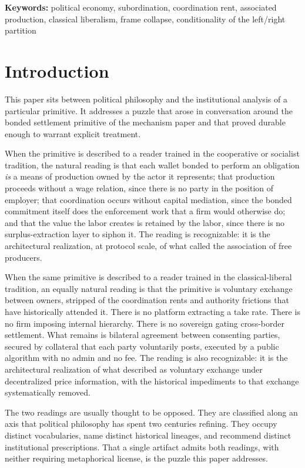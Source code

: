 \documentclass[11pt,a4paper]{article}
\theoremstyle{remark}
\begin{document}
\medskip
\noindent\textbf{Keywords:}
political economy, subordination, coordination rent, associated
production, classical liberalism, frame collapse, conditionality of
the left/right partition

\section{Introduction}
\label{sec:intro}

This paper sits between political philosophy and the institutional
analysis of a particular primitive. It addresses a puzzle that
arose in conversation around the bonded settlement primitive
of the mechanism paper and that proved durable enough to
warrant explicit treatment.

When the primitive is described to a reader trained in the
cooperative or socialist tradition, the natural reading is that
each wallet bonded to perform an obligation \emph{is} a means of
production owned by the actor it represents; that production
proceeds without a wage relation, since there is no party in the
position of employer; that coordination occurs without capital
mediation, since the bonded commitment itself does the
enforcement work that a firm would otherwise do; and that the
value the labor creates is retained by the labor, since there
is no surplus-extraction layer to siphon it. The reading is
recognizable: it is the architectural realization, at protocol
scale, of what \citet{marx1867capital} called the association of
free producers.

When the same primitive is described to a reader trained in the
classical-liberal tradition, an equally natural reading is that
the primitive is voluntary exchange between owners, stripped of the
coordination rents and authority frictions that have historically
attended it. There is no platform extracting a take rate. There
is no firm imposing internal hierarchy. There is no sovereign
gating cross-border settlement. What remains is bilateral
agreement between consenting parties, secured by collateral that
each party voluntarily posts, executed by a public algorithm with
no admin and no fee. The reading is also recognizable: it is the
architectural realization of what
\citet{hayek1945knowledge,friedman1962capitalism} described as
voluntary exchange under decentralized price information, with the
historical impediments to that exchange systematically removed.

The two readings are usually thought to be opposed. They are
classified along an axis that political philosophy has spent two
centuries refining. They occupy distinct vocabularies, name
distinct historical lineages, and recommend distinct institutional
prescriptions. That a single artifact admits both readings, with
neither requiring metaphorical license, is the puzzle this paper
addresses.
\end{document}
